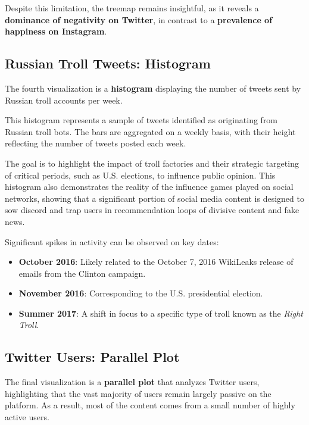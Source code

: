 \documentclass[a4paper,12pt,titlepage,leqno]{article}
\begin{document}
Despite this limitation, the treemap remains insightful, as it reveals a \textbf{dominance of negativity on Twitter}, in contrast to a \textbf{prevalence of happiness on Instagram}.

\subsection{Russian Troll Tweets: Histogram}
The fourth visualization is a \textbf{histogram} displaying the number of tweets sent by Russian troll accounts per week.

This histogram represents a sample of tweets identified as originating from Russian troll bots. The bars are aggregated on a weekly basis, with their height reflecting the number of tweets posted each week.

The goal is to highlight the impact of troll factories and their strategic targeting of critical periods, such as U.S. elections, to influence public opinion. This histogram also demonstrates the reality of the influence games played on social networks, showing that a significant portion of social media content is designed to sow discord and trap users in recommendation loops of divisive content and fake news.

Significant spikes in activity can be observed on key dates:
\begin{itemize}
\item \textbf{October 2016}: Likely related to the October 7, 2016 WikiLeaks release of emails from the Clinton campaign.
\item \textbf{November 2016}: Corresponding to the U.S. presidential election.
\item \textbf{Summer 2017}: A shift in focus to a specific type of troll known as the \textit{Right Troll}.
\end{itemize}

\subsection{Twitter Users: Parallel Plot}
The final visualization is a \textbf{parallel plot} that analyzes Twitter users, highlighting that the vast majority of users remain largely passive on the platform. As a result, most of the content comes from a small number of highly active users.
\end{document}
